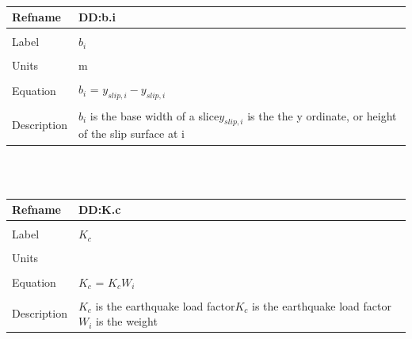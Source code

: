 \documentclass[12pt]{article}
\begin{document}
~\newline
\noindent \begin{minipage}{\textwidth}
\begin{tabular}{p{} p{}}
\toprule \textbf{Refname} & \textbf{DD:b.i}
\label{DD:b.i}
\\ \midrule \\
Label & $b_{i}$
\\ \midrule \\
Units & m
\\ \midrule \\
Equation & $b_{i}$ = $y_{slip,i}-y_{slip,i}$
\\ \midrule \\
Description & $b_{i}$ is the base width of a slice\newline$y_{slip,i}$ is the the y ordinate, or height of the slip surface at i
\\ \bottomrule \end{tabular}
\end{minipage}\\
~\newline
\noindent \begin{minipage}{\textwidth}
\begin{tabular}{p{} p{}}
\toprule \textbf{Refname} & \textbf{DD:K.c}
\label{DD:K.c}
\\ \midrule \\
Label & $K_{c}$
\\ \midrule \\
Units & 
\\ \midrule \\
Equation & $K_{c}$ = $K_{c}W_{i}$
\\ \midrule \\
Description & $K_{c}$ is the earthquake load factor\newline$K_{c}$ is the earthquake load factor\newline$W_{i}$ is the weight
\\ \bottomrule \end{tabular}
\end{minipage}\\
~\newline
\end{document}
